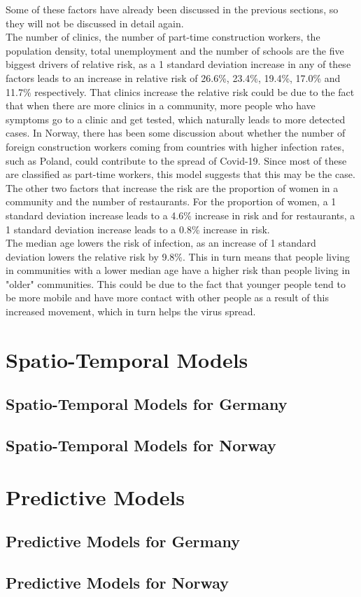 Some of these factors have already been discussed in the previous sections, so they will not be discussed in detail again. \\
The number of clinics, the number of part-time construction workers, the population density, total unemployment and the number of schools are the five biggest drivers of relative risk, as a 1 standard deviation increase in any of these factors leads to an increase in relative risk of 26.6\%, 23.4\%, 19.4\%, 17.0\% and 11.7\% respectively. That clinics increase the relative risk could be due to the fact that when there are more clinics in a community, more people who have symptoms go to a clinic and get tested, which naturally leads to more detected cases. In Norway, there has been some discussion about whether the number of foreign construction workers coming from countries with higher infection rates, such as Poland, could contribute to the spread of Covid-19. Since most of these are classified as part-time workers, this model suggests that this may be the case. \\
The other two factors that increase the risk are the proportion of women in a community and the number of restaurants. For the proportion of women, a 1 standard deviation increase leads to a 4.6\% increase in risk and for restaurants, a 1 standard deviation increase leads to a 0.8\% increase in risk. \\
The median age lowers the risk of infection, as an increase of 1 standard deviation lowers the relative risk by 9.8\%. This in turn means that people living in communities with a lower median age have a higher risk than people living in "older" communities. This could be due to the fact that younger people tend to be more mobile and have more contact with other people as a result of this increased movement, which in turn helps the virus spread.
\clearpage
\section{Spatio-Temporal Models}
\subsection{Spatio-Temporal Models for Germany}
\subsection{Spatio-Temporal Models for Norway}
\section{Predictive Models}
\clearpage
\subsection{Predictive Models for Germany}
\subsection{Predictive Models for Norway}